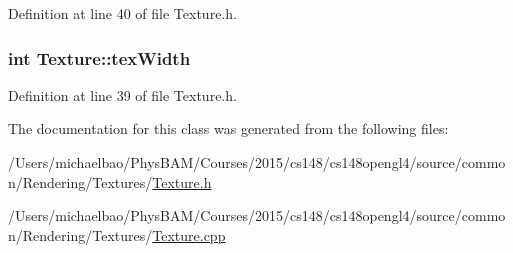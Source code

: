 Definition at line 40 of file Texture.\+h.

\hypertarget{class_texture_a3ce375542bd2d62f6e1793558c934373}{}
\subsubsection[{tex\+Width}]{\setlength{\rightskip}{0pt plus 5cm}int Texture\+::tex\+Width\hspace{0.3cm}{\ttfamily [private]}}\label{class_texture_a3ce375542bd2d62f6e1793558c934373}


Definition at line 39 of file Texture.\+h.



The documentation for this class was generated from the following files\+:\begin{DoxyCompactItemize}
\item 
/\+Users/michaelbao/\+Phys\+B\+A\+M/\+Courses/2015/cs148/cs148opengl4/source/common/\+Rendering/\+Textures/\hyperlink{_texture_8h}{Texture.\+h}\item 
/\+Users/michaelbao/\+Phys\+B\+A\+M/\+Courses/2015/cs148/cs148opengl4/source/common/\+Rendering/\+Textures/\hyperlink{_texture_8cpp}{Texture.\+cpp}\end{DoxyCompactItemize}
